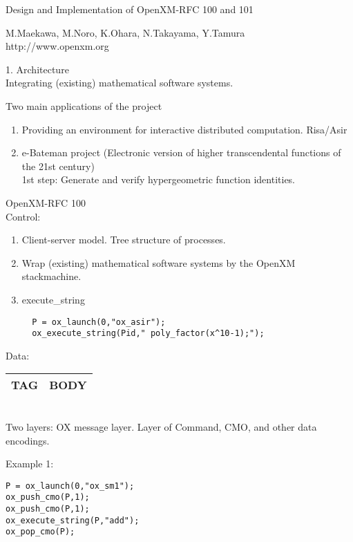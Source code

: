 \documentclass{slides}
\newcommand{\htmladdnormallink}[2]{#1}
\begin{document}
\noindent
{\color{green} Design and Implementation of OpenXM-RFC 100 and 101}

\noindent
M.Maekawa, M.Noro, K.Ohara, N.Takayama, Y.Tamura \\
\htmladdnormallink{http://www.openxm.org}{http://www.openxm.org}

\newpage
\noindent
{\color{red} 1. Architecture} \\
Integrating (existing) mathematical software systems.

Two main applications of the project \\
\begin{enumerate}
\item Providing an environment for interactive distributed computation.
{\color{blue} Risa/Asir}
\item e-Bateman project 
(Electronic version of higher transcendental functions of the 21st century)\\
1st step: Generate and verify hypergeometric function identities.
\end{enumerate}
\newpage

\noindent
OpenXM-RFC 100 \\
{\color{green} Control}: \\
\begin{enumerate}
\item Client-server model. Tree structure of processes.
\item Wrap (existing) mathematical software systems by the
OpenXM {\color{red} stackmachine}.
\item execute\_string
\begin{verbatim}
  P = ox_launch(0,"ox_asir");
  ox_execute_string(Pid," poly_factor(x^10-1);");
\end{verbatim}
\end{enumerate}
\newpage

\noindent
{\color{green} Data}: \\
\begin{tabular}{|c|c|}
\hline
{\color{red} TAG}& {\color{blue} BODY} \\ 
\hline
\end{tabular} \\
Two layers: {\color{green} OX message} layer. 
Layer of Command, CMO, and other data encodings.

\noindent
{\color{blue} Example 1}: \\
\begin{verbatim}
P = ox_launch(0,"ox_sm1");
ox_push_cmo(P,1);
ox_push_cmo(P,1);
ox_execute_string(P,"add");
ox_pop_cmo(P);
\end{verbatim}
\end{document}
